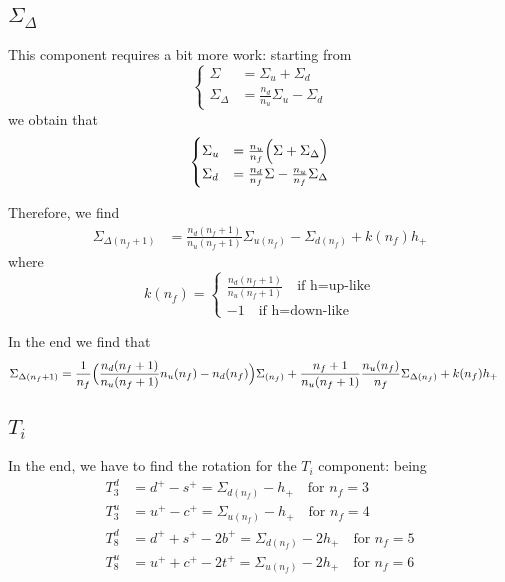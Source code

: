 \documentclass[a4paper,oneside]{article}
\begin{document}
\subsection{$\Sigma_{\Delta}$}
This component requires a bit more work: starting from
\begin{equation*}
\begin{cases}
\Sigma &= \Sigma_u+\Sigma_d \\
\Sigma_{\Delta} &= \frac{n_d}{n_u}\Sigma_u-\Sigma_d
\end{cases}
\end{equation*}
we obtain that
\begin{equation*}
\begin{cases}
\Sigma_u &= \frac{n_u}{n_f}\Bigl(\Sigma+\Sigma_{\Delta} \Bigr)\\
\Sigma_d &= \frac{n_d}{n_f}\Sigma-\frac{n_u}{n_f}\Sigma_{\Delta}
\end{cases}
\end{equation*}

Therefore, we find
\begin{align*}
\Sigma_{\Delta(n_f+1)} &= \frac{n_d(n_f+1)}{n_u(n_f+1)}\Sigma_{u(n_f)} - \Sigma_{d(n_f)} + k(n_f) h_+
\end{align*}
where
\begin{equation*}
k(n_f) =
\begin{cases}
\frac{n_d(n_f+1)}{n_u(n_f+1)} \quad \text{if h=up-like}\\
-1  \quad \text{if h=down-like}
\end{cases}
\end{equation*}

In the end we find that
\begin{align*}
\Sigma_{\Delta(n_f+1)} &= \frac{1}{n_f}\Bigl(\frac{n_d(n_f+1)}{n_u(n_f+1)}n_u(n_f)-n_d(n_f)\Bigr)\Sigma_{(n_f)} + \frac{n_f+1}{n_u(n_f+1)}\frac{n_u(n_f)}{n_f}\Sigma_{\Delta(n_f)} + k(n_f) h_+
\end{align*}

\subsection{$T_i$}
In the end, we have to find the rotation for the $T_i$ component: being
\begin{align*}
T_3^d &=d^+ - s^+ = \Sigma_{d(n_f)} - h_+\quad \text{for $n_f=3$}\\
T_3^u &=u^+ - c^+ =\Sigma_{u(n_f)} - h_+\quad \text{for $n_f=4$}\\
T_8^d &=d^+ + s^+ - 2b^+ =\Sigma_{d(n_f)} - 2h_+\quad \text{for $n_f=5$}\\
T_8^u &=u^+ + c^+ - 2t^+ =\Sigma_{u(n_f)} - 2h_+\quad \text{for $n_f=6$}
\end{align*}
\end{document}
